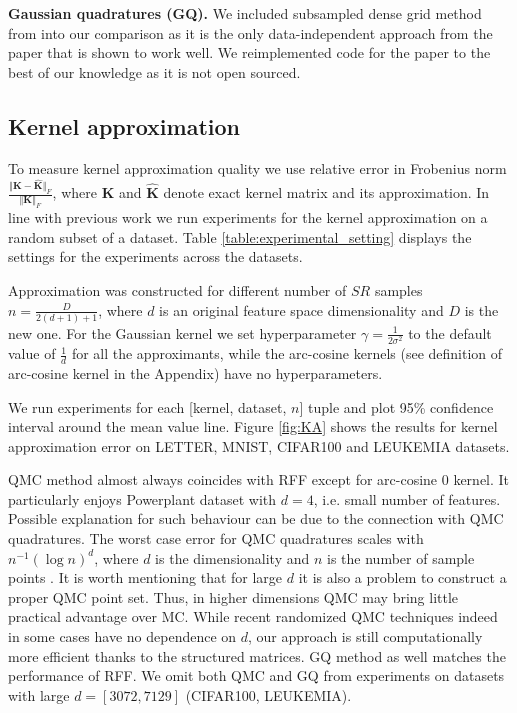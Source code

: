 \textbf{Gaussian quadratures (GQ).} We included subsampled dense grid method from \citep{dao2017gaussian} into our comparison as it is the only data-independent approach from the paper that is shown to work well. We reimplemented code for the paper to the best of our knowledge as it is not open sourced.

\subsection{Kernel approximation}
\label{sub:kernelapprox}

To measure kernel approximation quality we use relative error  in Frobenius norm $\frac{\Vert \mathbf{K} - \mathbf{\hat{K}}\Vert_{F}}{\Vert \mathbf{K} \Vert_{F}}$, where $\mathbf{K}$ and $\mathbf{\hat{K}}$ denote exact kernel matrix and its approximation. In line with previous work we run experiments for the kernel approximation on a random subset of a dataset. Table \ref{table:experimental_setting} displays the settings for the experiments across the datasets.

Approximation was constructed for different number of $SR$ samples $n = \frac{D}{2(d+1)+1}$, where $d$ is an original feature space dimensionality and $D$ is the new one. For the Gaussian kernel we set hyperparameter $\gamma = \frac{1}{2\sigma^2}$ to the default value of $\frac{1}{d}$ for all the approximants, while the arc-cosine kernels (see definition of arc-cosine kernel in the Appendix) have no hyperparameters.

We run experiments for each [kernel, dataset, $n$] tuple and plot 95\% confidence interval around the mean value line. Figure \ref{fig:KA} shows the results for kernel approximation error on LETTER, MNIST, CIFAR100 and LEUKEMIA datasets. 

QMC method almost always coincides with RFF except for arc-cosine 0 kernel. It particularly enjoys Powerplant dataset with $d=4$, i.e. small number of features. Possible explanation for such behaviour can be due to the connection with QMC quadratures. The worst case error for QMC quadratures scales with $n^{-1}(\log n)^d$, where $d$ is the dimensionality and $n$ is the number of sample points \citep{owen1998latin}. It is worth mentioning that for large $d$ it is also a problem to construct a proper QMC point set. Thus, in higher dimensions QMC may bring little practical advantage over MC. While recent randomized QMC techniques indeed in some cases have no dependence on $d$, our approach is still computationally more efficient thanks to the structured matrices. GQ method as well matches the performance of RFF. We omit both QMC and GQ from experiments on datasets with large $d = [3072, 7129]$ (CIFAR100, LEUKEMIA).

